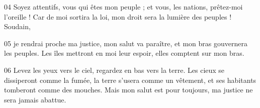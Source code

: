 
04 Soyez attentifs, vous qui êtes mon peuple ; et vous, les nations, prêtez-moi l’oreille ! Car de moi sortira la loi, mon droit sera la lumière des peuples ! Soudain,

05 je rendrai proche ma justice, mon salut va paraître, et mon bras gouvernera les peuples. Les îles mettront en moi leur espoir, elles comptent sur mon bras.

06 Levez les yeux vers le ciel, regardez en bas vers la terre. Les cieux se dissiperont comme la fumée, la terre s’usera comme un vêtement, et ses habitants tomberont comme des mouches. Mais mon salut est pour toujours, ma justice ne sera jamais abattue.
